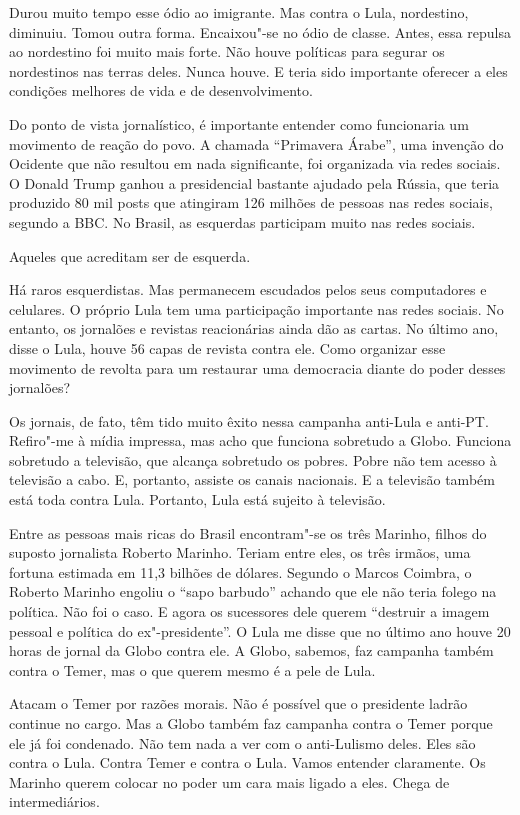 \falaM Durou muito tempo esse ódio ao imigrante. Mas contra o Lula,
nordestino, diminuiu. Tomou outra forma. Encaixou"-se no ódio de classe.
Antes, essa repulsa ao nordestino foi muito mais forte. Não houve
políticas para segurar os nordestinos nas terras deles. Nunca houve. E
teria sido importante oferecer a eles condições melhores de vida e de
desenvolvimento.

\falaG Do ponto de vista jornalístico, é importante entender como
funcionaria um movimento de reação do povo. A chamada ``Primavera
Árabe'', uma invenção do Ocidente que não resultou em nada significante,
foi organizada via redes sociais. O Donald Trump ganhou a presidencial
bastante ajudado pela Rússia, que teria produzido 80 mil posts que
atingiram 126 milhões de pessoas nas redes sociais, segundo a BBC. No
Brasil, as esquerdas participam muito nas redes sociais.

\falaM Aqueles que acreditam ser de esquerda.

\falaG Há raros esquerdistas. Mas permanecem escudados pelos seus
computadores e celulares. O próprio Lula tem uma participação importante
nas redes sociais. No entanto, os jornalões e revistas reacionárias
ainda dão as cartas. No último ano, disse o Lula, houve 56 capas de
revista contra ele. Como organizar esse movimento de revolta para um
restaurar uma democracia diante do poder desses jornalões?

\falaM Os jornais, de fato, têm tido muito êxito nessa campanha anti-Lula e
anti-PT. Refiro"-me à mídia impressa, mas acho que funciona sobretudo a
Globo. Funciona sobretudo a televisão, que alcança sobretudo os pobres.
Pobre não tem acesso à televisão a cabo. E, portanto, assiste os canais
nacionais. E a televisão também está toda contra Lula. Portanto, Lula
está sujeito à televisão.

\falaG Entre as pessoas mais ricas do Brasil encontram"-se os três Marinho,
filhos do suposto jornalista Roberto Marinho. Teriam entre eles, os três
irmãos, uma fortuna estimada em 11,3 bilhões de dólares. Segundo o
Marcos Coimbra, o Roberto Marinho engoliu o ``sapo barbudo'' achando que
ele não teria folego na política. Não foi o caso. E agora os sucessores
dele querem ``destruir a imagem pessoal e política do ex"-presidente''. O
Lula me disse que no último ano houve 20 horas de jornal da Globo contra
ele. A Globo, sabemos, faz campanha também contra o Temer, mas o que
querem mesmo é a pele de Lula.

\falaM Atacam o Temer por razões morais. Não é possível que o presidente
ladrão continue no cargo. Mas a Globo também faz campanha contra o Temer
porque ele já foi condenado. Não tem nada a ver com o anti-Lulismo
deles. Eles são contra o Lula. Contra Temer e contra o Lula. Vamos
entender claramente. Os Marinho querem colocar no poder um cara mais
ligado a eles. Chega de intermediários.

